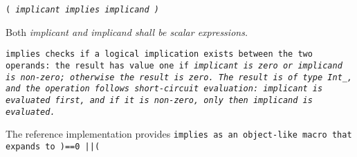 
\tt{(} \it{implicant} \tt{implies} \it{implicand} \tt{)}


Both \it{implicant} and \it{implicand} shall be scalar expressions.


\tt{implies} checks if a logical implication exists between the two operands:
the result has value one if \it{implicant} is zero or
\it{implicand} is non-zero; otherwise the result is zero.
The result is of type \tt{Int_}, and the operation follows
short-circuit evaluation: \it{implicant} is evaluated first,
and if it is non-zero, only then \it{implicand} is evaluated.

\note The reference implementation provides \tt{implies} as
an object-like macro that expands to \tt{)==0 ||}\s\s\tt{(}
